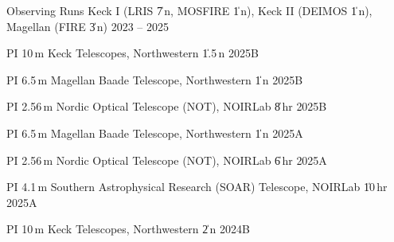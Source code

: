 \begin{cventries}


\cvsimpentry
    {Observing Runs}
    {Keck I (LRIS \| 7\,n, MOSFIRE \| 1\,n), Keck II (DEIMOS \| 1\,n), Magellan (FIRE \| 3\,n)}
    {2023 -- 2025}
    {}

\cvsimpentry
    {PI}
    {10\,m Keck Telescopes, Northwestern \| 1.5\,n}
    {2025B}
    {}

\cvsimpentry
    {PI}
    {6.5\,m Magellan Baade Telescope, Northwestern \| 1\,n}
    {2025B}
    {}

\cvsimpentry
    {PI}
    {2.56\,m Nordic Optical Telescope (NOT), NOIRLab \| 8\,hr}
    {2025B}
    {}

\cvsimpentry
    {PI}
    {6.5\,m Magellan Baade Telescope, Northwestern \| 1\,n}
    {2025A}
    {}

\cvsimpentry
    {PI}
    {2.56\,m Nordic Optical Telescope (NOT), NOIRLab \| 6\,hr}
    {2025A}
    {}

\cvsimpentry
    {PI}
    {4.1\,m Southern Astrophysical Research (SOAR) Telescope, NOIRLab \| 10\,hr}
    {2025A}
    {}
    
\cvsimpentry
    {PI}
    {10\,m Keck Telescopes, Northwestern \| 2\,n}
    {2024B}
    {}







\end{cventries}